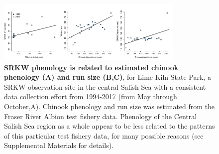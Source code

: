 \documentclass{article}
\begin{document}
\begin{figure}[p]
\includegraphics[width=0.8\textwidth]{../analyses/orcaphen/figures/lime_albchin.pdf} 
\caption{\textbf{SRKW phenology is related to estimated chinook phenology (A) and run size (B,C)}, for Lime Kiln State Park, a SRKW observation site in the central Salish Sea with a consistent data collection effort from 1994-2017 (from May through October,A). Chinook phenology and run size was estimated from the Fraser River Albion test fishery data. Phenology of the Central Salish Sea region as a whole appear to be less related to the patterns of this particular test fishery data, for many possible reasons (see Supplemental Materials for details).}
 \label{fig:shifts}
 \end{figure}
\end{document}
